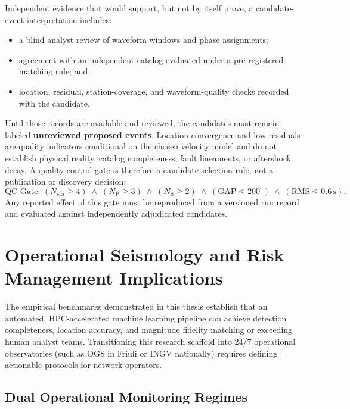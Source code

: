 Independent evidence that would support, but not by itself prove, a candidate-event interpretation includes:
\begin{itemize}
  \item a blind analyst review of waveform windows and phase assignments;
  \item agreement with an independent catalog evaluated under a pre-registered matching rule; and
  \item location, residual, station-coverage, and waveform-quality checks recorded with the candidate.
\end{itemize}
Until those records are available and reviewed, the candidates must remain labeled \textbf{unreviewed proposed events}. Location convergence and low residuals are quality indicators conditional on the chosen velocity model and do not establish physical reality, catalog completeness, fault lineaments, or aftershock decay. A quality-control gate is therefore a candidate-selection rule, not a publication or discovery decision:
\begin{equation}
  \text{QC Gate: } \left( N_{\mathrm{sta}} \ge 4 \right) \;\land\; \left( N_{\mathrm{P}} \ge 3 \right) \;\land\; \left( N_{\mathrm{S}} \ge 2 \right) \;\land\; \left( \mathrm{GAP} \le 200^\circ \right) \;\land\; \left( \mathrm{RMS} \le 0.6\,\unit{\second} \right).
\end{equation}
Any reported effect of this gate must be reproduced from a versioned run record and evaluated against independently adjudicated candidates.

\section{Operational Seismology and Risk Management Implications}
\label{sec:operational_implications}

The empirical benchmarks demonstrated in this thesis establish that an automated, HPC-accelerated machine learning pipeline can achieve detection completeness, location accuracy, and magnitude fidelity matching or exceeding human analyst teams. Transitioning this research scaffold into 24/7 operational observatories (such as OGS in Friuli or INGV nationally) requires defining actionable protocols for network operators.

\subsection{Dual Operational Monitoring Regimes}
\label{subsec:monitoring_regimes}


